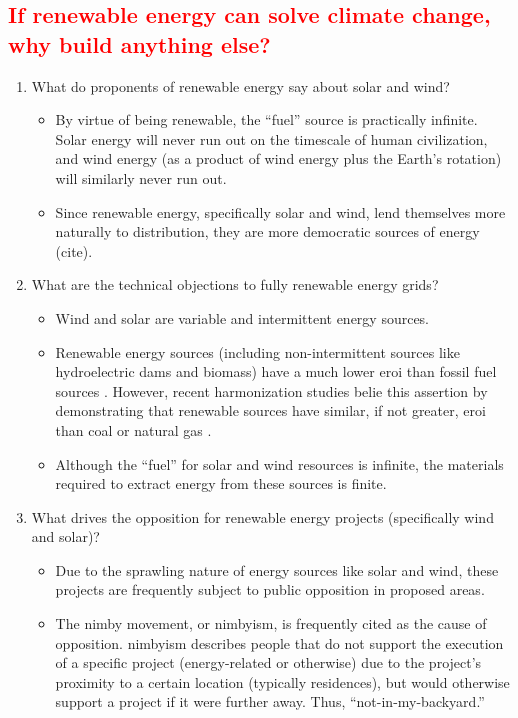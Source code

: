 \subsection{\textcolor{red}{If renewable energy can solve climate change, why build anything else?}}

\begin{enumerate}
    \item What do proponents of renewable energy say about solar and wind?
    \begin{itemize}
        \item By virtue of being renewable, the ``fuel'' source is practically infinite. Solar energy will 
        never run out on the timescale of human civilization, and wind energy (as a product of wind energy plus
        the Earth's rotation) will similarly never run out.
        \item Since renewable energy, specifically solar and wind, lend themselves more naturally to distribution,
        they are more democratic sources of energy (cite).
    \end{itemize}
    \item What are the technical objections to fully renewable energy grids?
    \begin{itemize}
        \item Wind and solar are variable and intermittent energy sources.
        \item Renewable energy sources (including non-intermittent sources like hydroelectric dams and biomass) have a much lower \ac{eroi}
        than fossil fuel sources \cite{hall_eroi_2014,weisbach_energy_2013}. However, recent harmonization studies belie this assertion
        by demonstrating that renewable sources have similar, if not greater, \ac{eroi} than coal or natural gas \cite{murphy_energy_2022}.
        \item Although the ``fuel'' for solar and wind resources is infinite, the materials required to extract energy
        from these sources is finite.
    \end{itemize}
    \item What drives the opposition for renewable energy projects (specifically wind and solar)?
    \begin{itemize}
        \item Due to the sprawling nature of energy sources like solar and wind, these projects are frequently subject to 
        public opposition in proposed areas.
        \item The \ac{nimby} movement, or \acs{nimbyism}, is frequently cited as the cause of opposition. \acs{nimbyism} describes
        people that do not support the execution of a specific project (energy-related or otherwise) due to the project's proximity
        to a certain location (typically residences), but would otherwise support a project if it were further away. 
        Thus, ``not-in-my-backyard.''
    \end{itemize}
\end{enumerate}